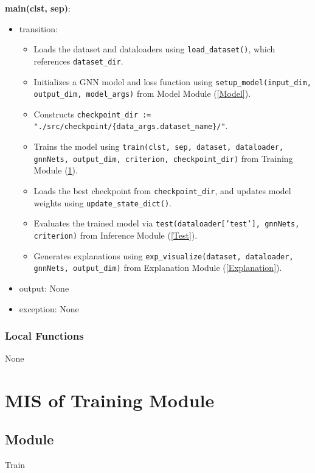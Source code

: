\documentclass[12pt, titlepage]{article}
\begin{document}
\noindent \textbf{main(clst, sep)}:
\begin{itemize}
  \item transition:
  \begin{itemize}
    \item Loads the dataset and dataloaders using \texttt{load\_dataset()}, which references \texttt{dataset\_dir}.
    \item Initializes a GNN model and loss function using \texttt{setup\_model(input\_dim, output\_dim, model\_args)} from Model Module (\ref{Model}).
    \item Constructs \texttt{checkpoint\_dir := "./src/checkpoint/\{data\_args.dataset\_name\}/"}.
    \item Trains the model using \texttt{train(clst, sep, dataset, dataloader, gnnNets, output\_dim, criterion, checkpoint\_dir)} from Training Module (\ref{Train}).
    \item Loads the best checkpoint from \texttt{checkpoint\_dir}, and updates model weights using \texttt{update\_state\_dict()}.
    \item Evaluates the trained model via \texttt{test(dataloader['test'], gnnNets, criterion)} from Inference Module (\ref{Test}).
    \item Generates explanations using \texttt{exp\_visualize(dataset, dataloader, gnnNets, output\_dim)} from Explanation Module (\ref{Explanation}).
  \end{itemize}
  \item output: None
  \item exception: None
\end{itemize}

\subsubsection{Local Functions}
None




\newpage







\section{MIS of Training Module} \label{Train}

\subsection{Module}
Train
\end{document}
